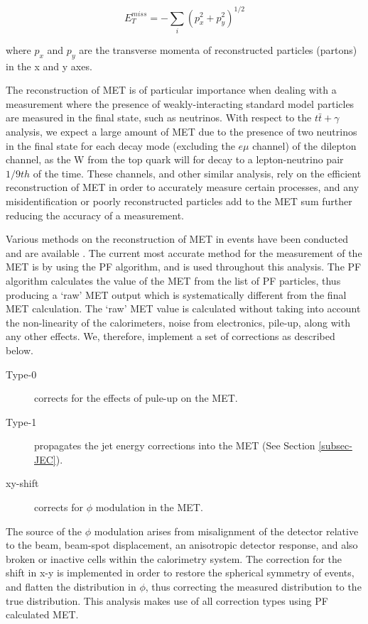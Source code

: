\begin{equation}
E^{miss}_T = - \sum_i(p^2_x + p^2_y)^{1/2}
\end{equation}

where $p_x$ and $p_y$ are the transverse momenta of reconstructed particles (partons) in the x and y axes.

The reconstruction of MET is of particular importance when dealing with a measurement where the presence of weakly-interacting standard model particles are measured in the final state, such as neutrinos.  With respect to the $t\bar{t}+\gamma$ analysis, we expect a large amount of MET due to the presence of two neutrinos in the final state for each decay mode (excluding the $e\mu$ channel) of the dilepton channel, as the W from the top quark will for decay to a lepton-neutrino pair $1/9th$ of the time. These channels, and other similar analysis, rely on the efficient reconstruction of MET in order to accurately measure certain processes, and any misidentification or poorly reconstructed particles add to the MET sum further reducing the accuracy of a measurement.  

Various methods on the reconstruction of MET in events have been conducted and are available \cite{1748-0221-6-09-P09001}. The current most accurate method for the measurement of the MET is by using the PF algorithm, and is used throughout this analysis. The PF algorithm calculates the value of the MET from the list of PF particles, thus producing a `raw' MET output which is systematically different from the final MET calculation. The `raw' MET value is calculated without taking into account the non-linearity of the calorimeters, noise from electronics, pile-up, along with any other effects. We, therefore, implement a set of corrections as described below.

\begin{description}
	\item[Type-0] corrects for the effects of pule-up on the MET.
	\item[Type-1] propagates the jet energy corrections into the MET (See Section \ref{subsec-JEC}). 
	\item[xy-shift] corrects for $\phi$ modulation in the MET.
\end{description}

The source of the $\phi$ modulation arises from misalignment of the detector relative to the beam, beam-spot displacement, an anisotropic detector response, and also broken or inactive cells within the calorimetry system. The correction for the shift in x-y is implemented in order to restore the spherical symmetry of events, and flatten the distribution in $\phi$, thus correcting the measured distribution to the true distribution. This analysis makes use of all correction types using PF calculated MET. 